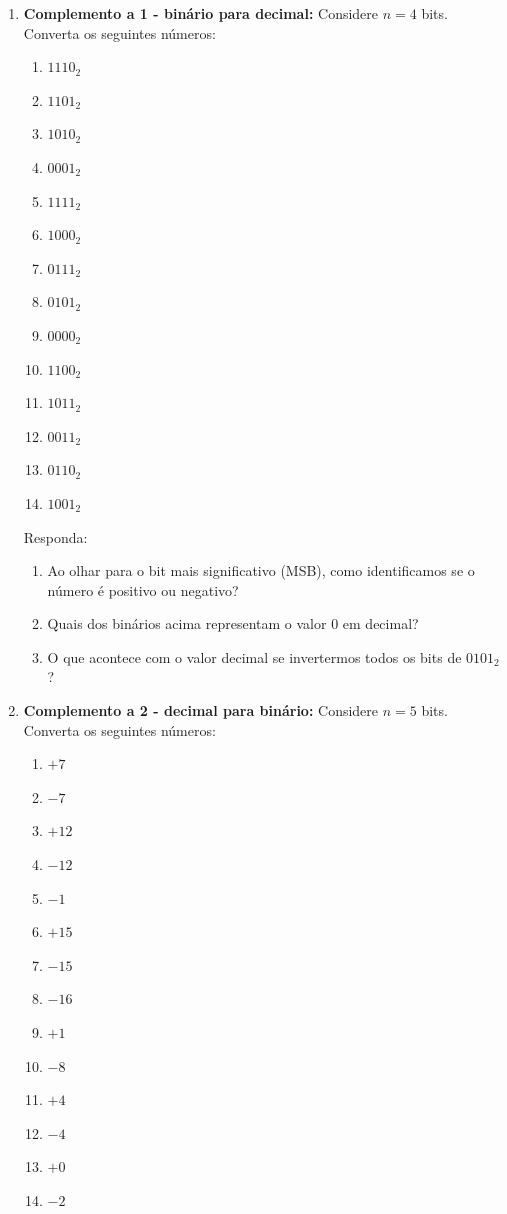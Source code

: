 \begin{enumerate}
    \item \textbf{Complemento a 1 - binário para decimal:}
          Considere $n = 4$ bits.
          Converta os seguintes números:
          \begin{enumerate}
              \item $1110_2$
              \item $1101_2$
              \item $1010_2$
              \item $0001_2$
              \item $1111_2$
              \item $1000_2$
              \item $0111_2$
              \item $0101_2$
              \item $0000_2$
              \item $1100_2$
              \item $1011_2$
              \item $0011_2$
              \item $0110_2$
              \item $1001_2$
          \end{enumerate}
          Responda:
          \begin{enumerate}
              \item Ao olhar para o bit mais significativo (MSB), como identificamos se o número é positivo ou negativo?
              \item Quais dos binários acima representam o valor $0$ em decimal?
              \item O que acontece com o valor decimal se invertermos todos os bits de $0101_2$?
          \end{enumerate}

    \item \textbf{Complemento a 2 - decimal para binário:}
          Considere $n = 5$ bits.
          Converta os seguintes números:
          \begin{enumerate}
              \item $+7$
              \item $-7$
              \item $+12$
              \item $-12$
              \item $-1$
              \item $+15$
              \item $-15$
              \item $-16$
              \item $+1$
              \item $-8$
              \item $+4$
              \item $-4$
              \item $+0$
              \item $-2$
          \end{enumerate}


\end{enumerate}
